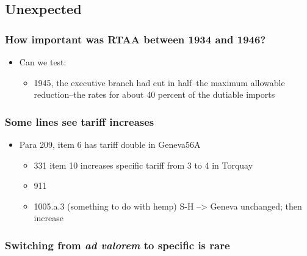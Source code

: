 \documentclass[
  12pt,
]{article}
\providecommand{\tightlist}{%
  \setlength{\itemsep}{0pt}\setlength{\parskip}{0pt}}
\begin{document}
\hypertarget{unexpected}{%
\subsection{Unexpected}\label{unexpected}}

\hypertarget{how-important-was-rtaa-between-1934-and-1946}{%
\subsubsection{How important was RTAA between 1934 and 1946?}\label{how-important-was-rtaa-between-1934-and-1946}}

\begin{itemize}
\item
  Can we test:

  \begin{itemize}
  \tightlist
  \item
    1945, the executive branch had cut in half--the maximum allowable reduction--the rates for about 40 percent of the dutiable imports
  \end{itemize}
\end{itemize}

\hypertarget{some-lines-see-tariff-increases}{%
\subsubsection{Some lines see tariff increases}\label{some-lines-see-tariff-increases}}

\begin{itemize}
\item
  Para 209, item 6 has tariff double in Geneva56A

  \begin{itemize}
  \tightlist
  \item
    331 item 10 increases specific tariff from 3 to 4 in Torquay
  \item
    911
  \item
    1005.a.3 (something to do with hemp) S-H --\textgreater{} Geneva unchanged; then increase
  \end{itemize}
\end{itemize}

\hypertarget{switching-from-ad-valorem-to-specific-is-rare}{%
\subsubsection{\texorpdfstring{Switching from \emph{ad valorem} to specific is rare}{Switching from ad valorem to specific is rare}}\label{switching-from-ad-valorem-to-specific-is-rare}}
\end{document}
